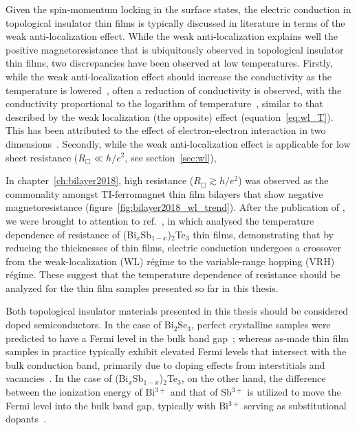 Given the spin-momentum locking in the surface states, the electric conduction in topological insulator thin films is typically discussed in literature in terms of the weak anti-localization effect. While the weak anti-localization explains well the positive magnetoresistance that is ubiquitously observed in topological insulator thin films, two discrepancies have been observed at low temperatures. Firstly, while the weak anti-localization effect should increase the conductivity as the temperature is lowered~\cite{bergmann1984}, often a reduction of conductivity is observed, with the conductivity proportional to the logarithm of temperature~\cite{Chen2011, Liu2011, Roy2013}, similar to that described by the weak localization (the opposite) effect (equation~\ref{eq:wl_T}). This has been attributed to the effect of electron-electron interaction in two dimensions~\cite{WL_ee}. Secondly, while the weak anti-localization effect is applicable for low sheet resistance ($R_\Box \ll h/e^2$, see section~\ref{sec:wl}), 

In chapter~\ref{ch:bilayer2018}, high resistance ($R_\Box \gtrsim h/e^2$) was observed as the commonality amongst TI-ferromagnet thin film bilayers that show negative magnetoresistance (figure~\ref{fig:bilayer2018_wl_trend}). After the publication of \cite{bilayer2018}, we were brought to attention to ref.~\cite{liao2015}, in which \citeauthor{liao2015} analysed the temperature dependence of resistance of (Bi$_x$Sb$_{1-x}$)$_2$Te$_3$ thin films, demonstrating that by reducing the thicknesses of thin films, electric conduction undergoes a crossover from the weak-localization (WL) r\'egime to the variable-range hopping (VRH) r\'egime. These suggest that the temperature dependence of resistance should be analyzed for the thin film samples presented so far in this thesis.

Both topological insulator materials presented in this thesis should be considered doped semiconductors. In the case of Bi$_2$Se$_3$, perfect crystalline samples were predicted to have a Fermi level in the bulk band gap~\cite{TI_electronic_structure_zhang}; whereas as-made thin film samples in practice typically exhibit elevated Fermi levels that intersect with the bulk conduction band, primarily due to doping effects from interstitials and vacancies~\cite{TI_ARPES1, ARPES_thickness, zhangli2013, Zhanybek3, Fisher2010}. In the case of (Bi$_x$Sb$_{1-x}$)$_2$Te$_3$, on the other hand, the difference between the ionization energy of Bi$^{3+}$ and that of Sb$^{3+}$ is utilized to move the Fermi level into the bulk band gap, typically with Bi$^{3+}$ serving as substitutional dopants~\cite{ZhangJS2011, TI_electronic_structure_zhang}.


